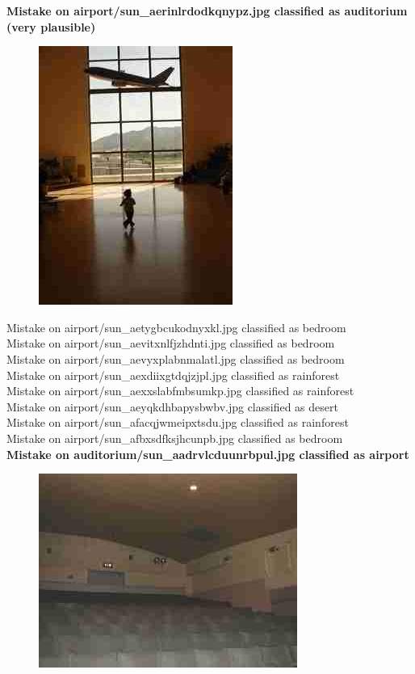 \documentclass[12pt]{article}
\begin{document}
{\bf Mistake on airport/sun\_aerinlrdodkqnypz.jpg classified as auditorium (very plausible) \\}
\begin{figure}
\centering
\includegraphics[width=0.5\linewidth]{../dat/airport/sun_aerinlrdodkqnypz.jpg}
\end{figure}
Mistake on airport/sun\_aetygbcukodnyxkl.jpg classified as bedroom \\
Mistake on airport/sun\_aevitxnlfjzhdnti.jpg classified as bedroom \\
Mistake on airport/sun\_aevyxplabnmalatl.jpg classified as bedroom \\
Mistake on airport/sun\_aexdiixgtdqjzjpl.jpg classified as rainforest \\
Mistake on airport/sun\_aexxslabfmbsumkp.jpg classified as rainforest \\
Mistake on airport/sun\_aeyqkdhbapysbwbv.jpg classified as desert \\
Mistake on airport/sun\_afacqjwmeipxtsdu.jpg classified as rainforest \\
Mistake on airport/sun\_afbxsdfksjhcunpb.jpg classified as bedroom \\
{\bf Mistake on auditorium/sun\_aadrvlcduunrbpul.jpg classified as airport \\}
\begin{figure}
\centering
\includegraphics[width=0.5\linewidth]{../dat/auditorium/sun_aadrvlcduunrbpul.jpg}
\end{figure}
\end{document}

